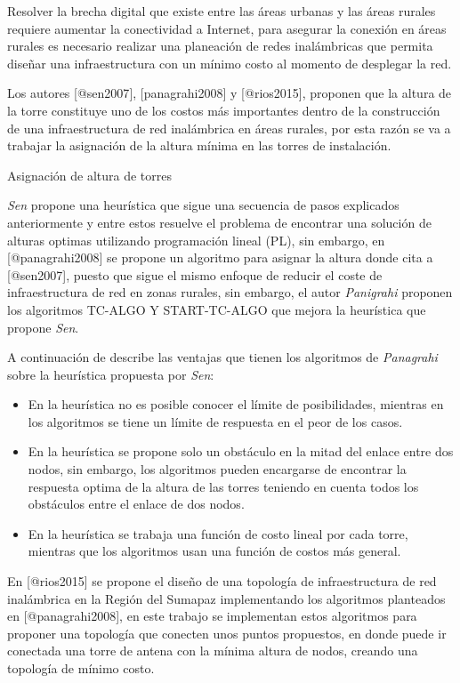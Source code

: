\documentclass[]{article}
\begin{document}
Resolver la brecha digital que existe entre las áreas urbanas y las
áreas rurales requiere aumentar la conectividad a Internet, para
asegurar la conexión en áreas rurales es necesario realizar una
planeación de redes inalámbricas que permita diseñar una infraestructura
con un mínimo costo al momento de desplegar la red.

Los autores {[}@sen2007{]}, {[}panagrahi2008{]} y {[}@rios2015{]},
proponen que la altura de la torre constituye uno de los costos más
importantes dentro de la construcción de una infraestructura de red
inalámbrica en áreas rurales, por esta razón se va a trabajar la
asignación de la altura mínima en las torres de instalación.

Asignación de altura de torres

\emph{Sen} propone una heurística que sigue una secuencia de pasos
explicados anteriormente y entre estos resuelve el problema de encontrar
una solución de alturas optimas utilizando programación lineal (PL), sin
embargo, en {[}@panagrahi2008{]} se propone un algoritmo para asignar la
altura donde cita a {[}@sen2007{]}, puesto que sigue el mismo enfoque de
reducir el coste de infraestructura de red en zonas rurales, sin
embargo, el autor \emph{Panigrahi} proponen los algoritmos TC-ALGO Y
START-TC-ALGO que mejora la heurística que propone \emph{Sen}.

A continuación de describe las ventajas que tienen los algoritmos de
\emph{Panagrahi} sobre la heurística propuesta por \emph{Sen}:

\begin{itemize}
\item
  En la heurística no es posible conocer el límite de posibilidades,
  mientras en los algoritmos se tiene un límite de respuesta en el peor
  de los casos.
\item
  En la heurística se propone solo un obstáculo en la mitad del enlace
  entre dos nodos, sin embargo, los algoritmos pueden encargarse de
  encontrar la respuesta optima de la altura de las torres teniendo en
  cuenta todos los obstáculos entre el enlace de dos nodos.
\item
  En la heurística se trabaja una función de costo lineal por cada
  torre, mientras que los algoritmos usan una función de costos más
  general.
\end{itemize}

En {[}@rios2015{]} se propone el diseño de una topología de
infraestructura de red inalámbrica en la Región del Sumapaz
implementando los algoritmos planteados en {[}@panagrahi2008{]}, en este
trabajo se implementan estos algoritmos para proponer una topología que
conecten unos puntos propuestos, en donde puede ir conectada una torre
de antena con la mínima altura de nodos, creando una topología de mínimo
costo.
\end{document}
